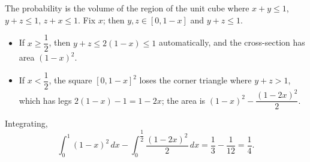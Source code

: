 The probability is the volume of the region of the unit cube where $x+y\le1$, $y+z\le1$, $z+x\le1$. Fix $x$; then $y,z\in[0,1-x]$ and $y+z\le1$.
\begin{itemize}
\item If $x\ge\dfrac{1}{2}$, then $y+z\le2(1-x)\le1$ automatically, and the cross-section has area $(1-x)^2$.
\item If $x<\dfrac{1}{2}$, the square $[0,1-x]^2$ loses the corner triangle where $y+z>1$, which has legs $2(1-x)-1=1-2x$; the area is $(1-x)^2-\dfrac{(1-2x)^2}{2}$.
\end{itemize}
Integrating,
\[
\int_0^1(1-x)^2\,dx-\int_0^{\dfrac{1}{2}}\dfrac{(1-2x)^2}{2}\,dx=\dfrac{1}{3}-\dfrac{1}{12}=\boxed{\dfrac{1}{4}}.
\]
